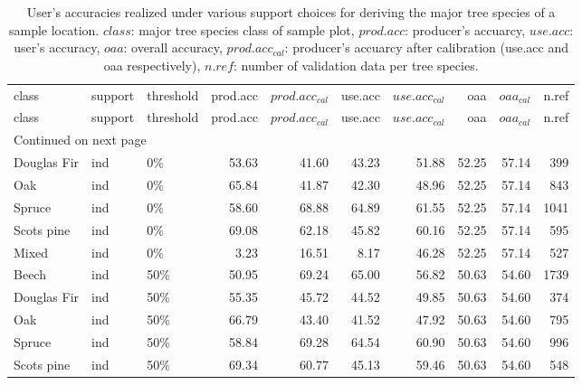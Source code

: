 \begingroup\fontsize{9pt}{10pt}\selectfont
\begin{longtable}{lllrrrrrrr}
\caption{User's accuracies realized under various support choices for deriving 
                          the major tree species of a sample location. $class$: major tree species class of 
                          sample plot,
                          $prod.acc$: producer's accuarcy, $use.acc$: user's accuracy, $oaa$: overall accuracy,
                          $prod.acc_{cal}$: producer's accuarcy after calibration (use.acc and oaa respectively),
                          $n.ref$: number of validation data per tree species.}\\ \\
                          \hline
class & support & threshold & prod.acc & $prod.acc_{cal}$ & use.acc & $use.acc_{cal}$ & oaa & $oaa_{cal}$ & n.ref \\ 
  \hline
\endfirsthead
\hline
class & support & threshold & prod.acc & $prod.acc_{cal}$ & use.acc & $use.acc_{cal}$ & oaa & $oaa_{cal}$ & n.ref \\ 
  \hline
\endhead
\hline
\multicolumn{10}{l}{\footnotesize Continued on next page}
\endfoot
\endlastfoot
Beech & ind & 0\% & 50.77 & 70.64 & 66.69 & 58.31 & 52.25 & 57.14 & 1873 \\ 
  Douglas Fir & ind & 0\% & 53.63 & 41.60 & 43.23 & 51.88 & 52.25 & 57.14 & 399 \\ 
  Oak & ind & 0\% & 65.84 & 41.87 & 42.30 & 48.96 & 52.25 & 57.14 & 843 \\ 
  Spruce & ind & 0\% & 58.60 & 68.88 & 64.89 & 61.55 & 52.25 & 57.14 & 1041 \\ 
  Scots pine & ind & 0\% & 69.08 & 62.18 & 45.82 & 60.16 & 52.25 & 57.14 & 595 \\ 
  Mixed & ind & 0\% & 3.23 & 16.51 & 8.17 & 46.28 & 52.25 & 57.14 & 527 \\ 
  Beech & ind & 50\% & 50.95 & 69.24 & 65.00 & 56.82 & 50.63 & 54.60 & 1739 \\ 
  Douglas Fir & ind & 50\% & 55.35 & 45.72 & 44.52 & 49.85 & 50.63 & 54.60 & 374 \\ 
  Oak & ind & 50\% & 66.79 & 43.40 & 41.52 & 47.92 & 50.63 & 54.60 & 795 \\ 
  Spruce & ind & 50\% & 58.84 & 69.28 & 64.54 & 60.90 & 50.63 & 54.60 & 996 \\ 
  Scots pine & ind & 50\% & 69.34 & 60.77 & 45.13 & 59.46 & 50.63 & 54.60 & 548 \\ 

\end{longtable}
